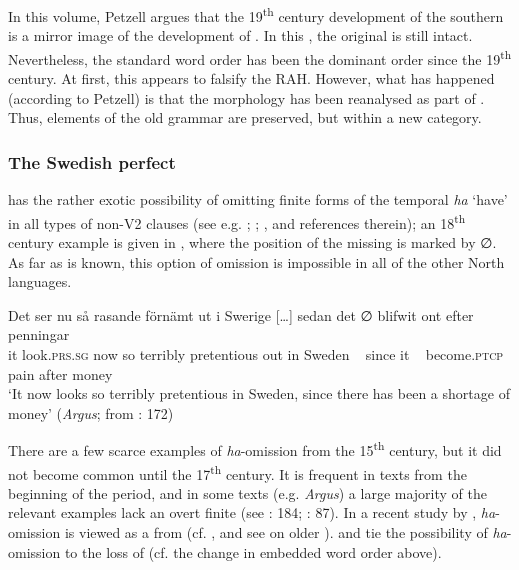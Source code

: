 \documentclass[output=paper]{langscibook}
\begin{document}
In this volume, Petzell argues that the 19\textsuperscript{th} century development of the southern   is a mirror image of the development of . In this , the original  is still intact. Nevertheless, the standard word order has been the dominant order since the 19\textsuperscript{th} century. At first, this appears to falsify the RAH. However, what has happened (according to Petzell) is that the  morphology has been reanalysed as part of . Thus, elements of the old grammar are preserved, but within a new category.


\subsubsection{ The Swedish perfect}\label{sec:intro:3.1.2}


 has the rather exotic possibility of omitting finite forms of the temporal  \textit{ha} ‘have’ in all types of non-V2 clauses (see e.g. \citealt{Julien2002}; \citealt{AndreassonEtAl2004}; \citealt{Backstrom2019}, and references therein); an 18\textsuperscript{th} century example is given in , where the position of the missing  is marked by ∅. As far as is known, this option of  omission is impossible in all of the other North  languages.


\ea\label{ex:intro:6}
\gll  Det     ser         nu   så rasande   förnämt   ut     i   Swerige […] sedan   det ∅ blifwit     ont     efter penningar\\
it     look.\textsc{prs.sg}   now   so terribly   pretentious out in   Sweden ~ since   it  ~ become\textsc{.ptcp}  pain    after money\\
\glt ‘It now looks so terribly pretentious in Sweden, since there has been a shortage of money’ (\textit{Argus}; from \citealt{Johannisson1945}: 172)
\z


There are a few scarce examples of \textit{ha}{}-omission from the 15\textsuperscript{th} century, but it did not become common until the 17\textsuperscript{th} century. It is frequent in texts from the beginning of the  period, and in some texts (e.g. \textit{Argus}) a large majority of the relevant examples lack an overt finite  (see \citealt{Johannisson1945}: 184; \citealt{Backstrom2019}: 87). In a recent study by \citet{Backstrom2019}, \textit{ha}{}-omission is viewed as a  from  (cf. \citealt{Johannisson1945}, and see \citealt{Breitbarth2005} on older ). \citet{Larsson2009} and \citet{Sangfelt2019} tie the possibility of \textit{ha}{}-omission to the loss of   (cf. the change in embedded word order above).
\end{document}
